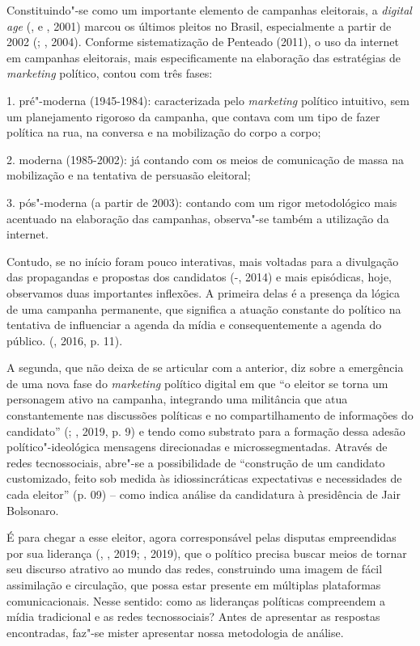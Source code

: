 Constituindo"-se como um importante elemento de campanhas eleitorais, a
\emph{digital age} (,  e , 2001) marcou os últimos
pleitos no Brasil, especialmente a partir de 2002 (; , 2004).
Conforme sistematização de Penteado (2011), o uso da internet em
campanhas eleitorais, mais especificamente na elaboração das estratégias
de \emph{marketing} político, contou com três fases:

1. pré"-moderna (1945-1984): caracterizada pelo \emph{marketing} político
intuitivo, sem um planejamento rigoroso da campanha, que contava com um
tipo de fazer política na rua, na conversa e na mobilização do corpo a
corpo;

2. moderna (1985-2002): já contando com os meios de comunicação de massa
na mobilização e na tentativa de persuasão eleitoral;

3. pós"-moderna (a partir de 2003): contando com um rigor metodológico
mais acentuado na elaboração das campanhas, observa"-se também a
utilização da internet.

Contudo, se no início foram pouco interativas, mais voltadas para a
divulgação das propagandas e propostas dos candidatos (-,
2014) e mais episódicas, hoje, observamos duas importantes inflexões. A
primeira delas é a presença da lógica de uma campanha permanente, que
significa a atuação constante do político na tentativa de influenciar a
agenda da mídia e consequentemente a agenda do público. (, 2016,
p. 11).

A segunda, que não deixa de se articular com a anterior, diz sobre a
emergência de uma nova fase do \emph{marketing} político digital em que
``o eleitor se torna um personagem ativo na campanha, integrando uma
militância que atua constantemente nas discussões políticas e no
compartilhamento de informações do candidato'' (; ,
2019, p. 9) e tendo como substrato para a formação dessa adesão
político"-ideológica mensagens direcionadas e microssegmentadas. Através
de redes tecnossociais, abre"-se a possibilidade de ``construção de um
candidato customizado, feito sob medida às idiossincráticas expectativas
e necessidades de cada eleitor'' (p. 09) -- como indica análise da
candidatura à presidência de Jair Bolsonaro.

É para chegar a esse eleitor, agora corresponsável pelas disputas
empreendidas por sua liderança (, , 2019; ,
2019), que o político precisa buscar meios de tornar seu discurso
atrativo ao mundo das redes, construindo uma imagem de fácil assimilação
e circulação, que possa estar presente em múltiplas plataformas
comunicacionais. Nesse sentido: como as lideranças políticas compreendem
a mídia tradicional e as redes tecnossociais? Antes de apresentar as
respostas encontradas, faz"-se mister apresentar nossa metodologia de
análise.

